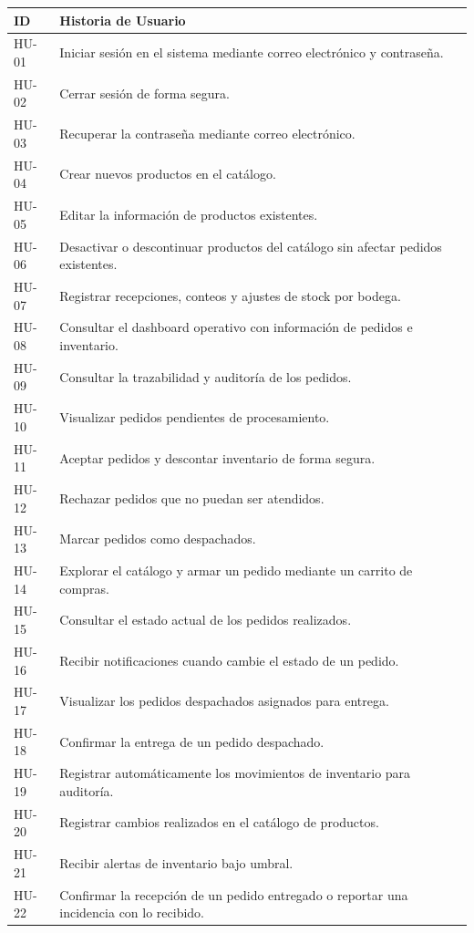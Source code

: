 \documentclass[12pt,a4paper]{report}
\begin{document}
\begin{longtable}{|p{2cm}|p{12cm}|}
\hline
\textbf{ID} & \textbf{Historia de Usuario} \\ \hline
HU-01 & Iniciar sesión en el sistema mediante correo electrónico y contraseña. \\ \hline
HU-02 & Cerrar sesión de forma segura. \\ \hline
HU-03 & Recuperar la contraseña mediante correo electrónico. \\ \hline
HU-04 & Crear nuevos productos en el catálogo. \\ \hline
HU-05 & Editar la información de productos existentes. \\ \hline
HU-06 & Desactivar o descontinuar productos del catálogo sin afectar pedidos existentes. \\ \hline
HU-07 & Registrar recepciones, conteos y ajustes de stock por bodega. \\ \hline
HU-08 & Consultar el dashboard operativo con información de pedidos e inventario. \\ \hline
HU-09 & Consultar la trazabilidad y auditoría de los pedidos. \\ \hline
HU-10 & Visualizar pedidos pendientes de procesamiento. \\ \hline
HU-11 & Aceptar pedidos y descontar inventario de forma segura. \\ \hline
HU-12 & Rechazar pedidos que no puedan ser atendidos. \\ \hline
HU-13 & Marcar pedidos como despachados. \\ \hline
HU-14 & Explorar el catálogo y armar un pedido mediante un carrito de compras. \\ \hline
HU-15 & Consultar el estado actual de los pedidos realizados. \\ \hline
HU-16 & Recibir notificaciones cuando cambie el estado de un pedido. \\ \hline
HU-17 & Visualizar los pedidos despachados asignados para entrega. \\ \hline
HU-18 & Confirmar la entrega de un pedido despachado. \\ \hline
HU-19 & Registrar automáticamente los movimientos de inventario para auditoría. \\ \hline
HU-20 & Registrar cambios realizados en el catálogo de productos. \\ \hline
HU-21 & Recibir alertas de inventario bajo umbral. \\ \hline
HU-22 & Confirmar la recepción de un pedido entregado o reportar una incidencia con lo recibido. \\ \hline

\end{longtable}
\end{document}
